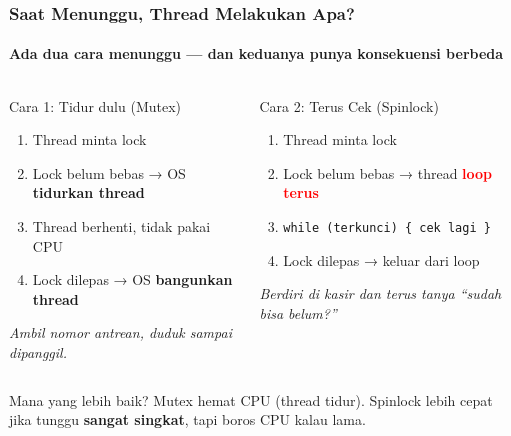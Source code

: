 \documentclass[t,aspectratio=169,xcolor=dvipsnames]{beamer}
\newcommand{\tem}[1]{\textbf{\textcolor{red}{#1}}}
\begin{document}
\begin{frame}
    \frametitle{Saat Menunggu, Thread Melakukan Apa?}
    \framesubtitle{Ada dua cara menunggu — dan keduanya punya konsekuensi berbeda}
    \footnotesize

    \begin{columns}[T]
        \begin{block}{Cara 1: Tidur dulu (Mutex)}
            \begin{enumerate}
                \item Thread minta lock
                \item Lock belum bebas → OS \textbf{tidurkan thread}
                \item Thread berhenti, tidak pakai CPU
                \item Lock dilepas → OS \textbf{bangunkan thread}
            \end{enumerate}
            \textit{Ambil nomor antrean, duduk sampai dipanggil.}
        \end{block}

        \begin{alertblock}{Cara 2: Terus Cek (Spinlock)}
            \begin{enumerate}
                \item Thread minta lock
                \item Lock belum bebas → thread \tem{loop terus}
                \item \texttt{while (terkunci) \{ cek lagi \}}
                \item Lock dilepas → keluar dari loop
            \end{enumerate}
            \textit{Berdiri di kasir dan terus tanya ``sudah bisa belum?''}
        \end{alertblock}
    \end{columns}

    \begin{exampleblock}{Mana yang lebih baik?}
        Mutex hemat CPU (thread tidur). Spinlock lebih cepat jika tunggu \textbf{sangat singkat}, tapi boros CPU kalau lama.
    \end{exampleblock}
\end{frame}
\end{document}

